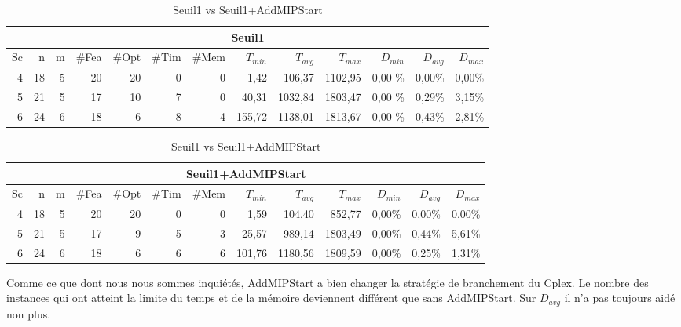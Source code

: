 \documentclass[twoside,fleqn]{EPURapport}
\begin{document}
\begin{table}[h]
    \centering
    \begin{tabular}{|r|r|r|r|r|r|r|r|r|r|r|r|r|}
    	\hline
    	\multicolumn{13}{|c|}{Seuil1}\\ \hline
Sc &	n	&m	&\#Fea	&\#Opt	&\#Tim &\#Mem	&$T_{min}$ & $T_{avg}$	& $T_{max}$ & $D_{min}$ & $D_{avg}$	& $D_{max}$ \\ \hline
4 &	18	&5	&20	    &20	&0	&0	&1,42	&106,37	&1102,95	&0,00	\%&0,00\%&	0,00\% \\ \hline
5 &	21	&5	&17	    &10	&7	&0	&40,31	&1032,84&	1803,47	&0,00	\%&0,29\%&	3,15\% \\ \hline
6 &	24	&6	&18	    &6	&8	&4	&155,72	&1138,01&	1813,67	&0,00	\%&0,43\%&	2,81\% \\ \hline
    \end{tabular}
    \label{tab_cut2_ams1_tab2}
\vspace{2em}
    \begin{tabular}{|r|r|r|r|r|r|r|r|r|r|r|r|r|}
    	\hline
    	\multicolumn{13}{|c|}{Seuil1+AddMIPStart}\\ \hline
Sc &	n	&m	&\#Fea	&\#Opt	&\#Tim &\#Mem	&$T_{min}$ & $T_{avg}$	& $T_{max}$ & $D_{min}$ & $D_{avg}$	& $D_{max}$ \\ \hline
4 &	18	&5	&20	  &20	&0	&0	&1,59	&104,40	&852,77	    &0,00\%&	0,00\%&	0,00\% \\ \hline
5 &	21	&5	&17	  &9	&5	&3	&25,57	&989,14	&1803,49	&0,00\%&	0,44\%&	5,61\% \\ \hline
6 &	24	&6	&18	  &6	&6	&6	&101,76	&1180,56&	1809,59	&0,00\%&	0,25\%&	1,31\% \\ \hline

    \end{tabular}
    \caption{Seuil1 vs Seuil1+AddMIPStart}
    \label{tab_cut2_ams1_tab2}
\end{table}
\bigskip
Comme ce que dont nous nous sommes inquiétés, AddMIPStart a bien changer la stratégie de branchement du Cplex. Le nombre des instances qui ont atteint la limite du temps et de la mémoire deviennent différent que sans AddMIPStart. Sur $D_{avg}$ il n'a pas toujours aidé non plus.
\clearpage
\end{document}
